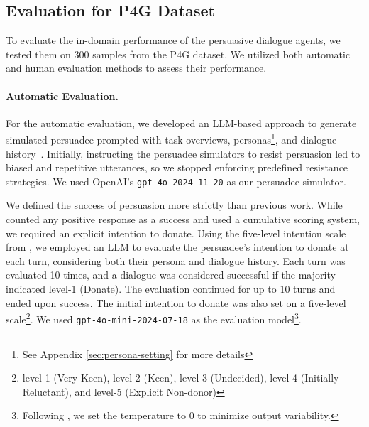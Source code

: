 \documentclass[11pt]{article}
\begin{document}

\subsection{Evaluation for P4G Dataset}

To evaluate the in-domain performance of the persuasive dialogue agents, we tested them on 300 samples from the P4G dataset. 
We utilized both automatic and human evaluation methods to assess their performance.

\paragraph{Automatic Evaluation.}
\label{sec:persuadee_simulator}
For the automatic evaluation, we developed an LLM-based approach to generate simulated persuadee prompted with task overviews, personas\footnote{See Appendix \ref{sec:persona-setting} for more details}, and dialogue history~\citep{zhang-etal-2024-strength}. 
Initially, instructing the persuadee simulators to resist persuasion led to biased and repetitive utterances, so we stopped enforcing predefined resistance strategies.
We used OpenAI's \texttt{gpt-4o-2024-11-20} as our persuadee simulator.

We defined the success of persuasion more strictly than previous work. 
While \citet{zhang-etal-2024-strength} counted any positive response as a success and \citet{yu-etal-2023-prompt} used a cumulative scoring system, we required an explicit intention to donate. 
Using the five-level intention scale from \citet{yu-etal-2023-prompt}, we employed an LLM to evaluate the persuadee's intention to donate at each turn, considering both their persona and dialogue history. 
Each turn was evaluated 10 times, and a dialogue was considered successful if the majority indicated level-1 (Donate).
The evaluation continued for up to 10 turns and ended upon success.
The initial intention to donate was also set on a five-level scale\footnote{level-1 (Very Keen), level-2 (Keen), level-3 (Undecided), level-4 (Initially Reluctant), and level-5 (Explicit Non-donor)}.
We used \texttt{gpt-4o-mini-2024-07-18} as the evaluation model\footnote{Following \citet{deng-etal-2023-prompting}, we set the temperature to 0 to minimize output variability.\label{fot:temp-0}}.
\end{document}
